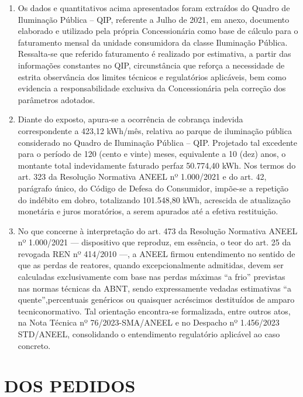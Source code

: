 \begin{enumerate}[resume]
\item
Os dados e quantitativos acima apresentados foram extraídos do Quadro de Iluminação Pública – QIP, referente a Julho de 2021, em anexo, documento elaborado e utilizado pela própria Concessionária como base de cálculo para o faturamento mensal da unidade consumidora da classe Iluminação Pública. Ressalta-se que referido faturamento é realizado por estimativa, a partir das informações constantes no QIP, circunstância que reforça a necessidade de estrita observância dos limites técnicos e regulatórios aplicáveis, bem como evidencia a responsabilidade exclusiva da Concessionária pela correção dos parâmetros adotados.

\item
Diante do exposto, apura-se a ocorrência de cobrança indevida correspondente a 423,12 kWh/mês, relativa ao parque de iluminação pública considerado no Quadro de Iluminação Pública – QIP. Projetado tal excedente para o período de 120 (cento e vinte) meses, equivalente a 10 (dez) anos, o montante total indevidamente faturado perfaz 50.774,40 kWh. Nos termos do art. 323 da Resolução Normativa ANEEL nº 1.000/2021 e do art. 42, parágrafo único, do Código de Defesa do Consumidor, impõe-se a repetição do indébito em dobro, totalizando 101.548,80 kWh, acrescida de atualização monetária e juros moratórios, a serem apurados até a efetiva restituição.

\item
No que concerne à interpretação do art. 473 da Resolução Normativa ANEEL nº 1.000/2021 — dispositivo que reproduz, em essência, o teor do art. 25 da revogada REN nº 414/2010 —, a ANEEL firmou entendimento no sentido de que as perdas de reatores, quando excepcionalmente admitidas, devem ser calculadas exclusivamente com base nas perdas máximas “a frio” previstas nas normas técnicas da ABNT, sendo expressamente vedadas estimativas “a quente”,percentuais genéricos ou quaisquer acréscimos destituídos de amparo tecniconormativo. Tal orientação encontra-se formalizada, entre outros atos, na Nota Técnica nº 76/2023-SMA/ANEEL e no Despacho nº 1.456/2023 STD/ANEEL, consolidando o entendimento regulatório aplicável ao caso concreto.
\end{enumerate}

\section{DOS PEDIDOS}

